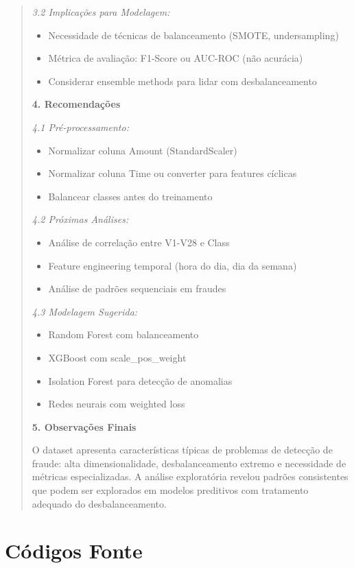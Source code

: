 \documentclass[12pt,a4paper]{article}
\begin{document}
\begin{quote}
\textit{3.2 Implicações para Modelagem:}
\begin{itemize}
    \item Necessidade de técnicas de balanceamento (SMOTE, undersampling)
    \item Métrica de avaliação: F1-Score ou AUC-ROC (não acurácia)
    \item Considerar ensemble methods para lidar com desbalanceamento
\end{itemize}

\textbf{4. Recomendações}

\textit{4.1 Pré-processamento:}
\begin{itemize}
    \item Normalizar coluna Amount (StandardScaler)
    \item Normalizar coluna Time ou converter para features cíclicas
    \item Balancear classes antes do treinamento
\end{itemize}

\textit{4.2 Próximas Análises:}
\begin{itemize}
    \item Análise de correlação entre V1-V28 e Class
    \item Feature engineering temporal (hora do dia, dia da semana)
    \item Análise de padrões sequenciais em fraudes
\end{itemize}

\textit{4.3 Modelagem Sugerida:}
\begin{itemize}
    \item Random Forest com balanceamento
    \item XGBoost com scale\_pos\_weight
    \item Isolation Forest para detecção de anomalias
    \item Redes neurais com weighted loss
\end{itemize}

\textbf{5. Observações Finais}

O dataset apresenta características típicas de problemas de detecção de fraude: alta dimensionalidade, desbalanceamento extremo e necessidade de métricas especializadas. A análise exploratória revelou padrões consistentes que podem ser explorados em modelos preditivos com tratamento adequado do desbalanceamento.
\end{quote}

\newpage
\section{Códigos Fonte}
\end{document}
